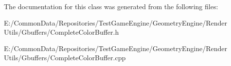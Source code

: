The documentation for this class was generated from the following files\+:\begin{DoxyCompactItemize}
\item 
E\+:/\+Common\+Data/\+Repositories/\+Test\+Game\+Engine/\+Geometry\+Engine/\+Render Utils/\+Gbuffers/Complete\+Color\+Buffer.\+h\item 
E\+:/\+Common\+Data/\+Repositories/\+Test\+Game\+Engine/\+Geometry\+Engine/\+Render Utils/\+Gbuffers/Complete\+Color\+Buffer.\+cpp\end{DoxyCompactItemize}
